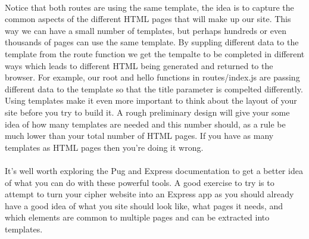 \documentclass[10pt, a4paper, twosize]{article}
\begin{document}
\paragraph{} Notice that both routes are using the same template, the idea is to capture the common aspects of the different HTML pages that will make up our site. This way we can have a small number of templates, but perhaps hundreds or even thousands of pages can use the same template. By suppling different data to the template from the route function we get the tempalte to be completed in different ways which leads to different HTML being generated and returned to the browser. For example, our root and hello functions in routes/index.js are passing different data to the template so that the title parameter is compelted differently. Using templates make it even more important to think about the layout of your site before you try to build it. A rough preliminary design will give your some idea of how many templates are needed and this number should, as a rule be much lower than your total number of HTML pages. If you have as many templates as HTML pages then you're doing it wrong.

\paragraph{} It's well worth exploring the Pug and Express documentation to get a better idea of what you can do with these powerful tools. A good exercise to try is to attempt to turn your cipher website into an Express app as you should already have a good idea of what you site should look like, what pages it needs, and which elements are common to multiple pages and can be extracted into templates.
\end{document}
